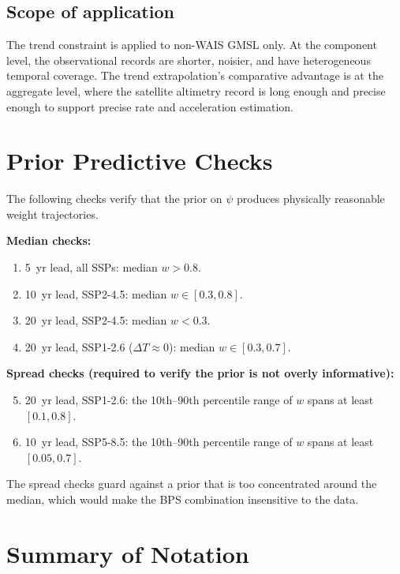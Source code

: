 \documentclass[11pt]{article}
\newcommand{\dT}{\Delta T}
\begin{document}
\subsection{Scope of application}

The trend constraint is applied to non-WAIS GMSL only.  At the component level, the observational records are shorter, noisier, and have heterogeneous temporal coverage.  The trend extrapolation's comparative advantage is at the aggregate level, where the satellite altimetry record is long enough and precise enough to support precise rate and acceleration estimation.


\section{Prior Predictive Checks}

The following checks verify that the prior on $\psi$ produces physically reasonable weight trajectories.

\textbf{Median checks:}
\begin{enumerate}
  \item 5~yr lead, all SSPs: median $w > 0.8$.
  \item 10~yr lead, SSP2-4.5: median $w \in [0.3, 0.8]$.
  \item 20~yr lead, SSP2-4.5: median $w < 0.3$.
  \item 20~yr lead, SSP1-2.6 ($\dT \approx 0$): median $w \in [0.3, 0.7]$.
\end{enumerate}

\textbf{Spread checks (required to verify the prior is not overly informative):}
\begin{enumerate}
  \setcounter{enumi}{4}
  \item 20~yr lead, SSP1-2.6: the 10th--90th percentile range of $w$ spans at least $[0.1, 0.8]$.
  \item 10~yr lead, SSP5-8.5: the 10th--90th percentile range of $w$ spans at least $[0.05, 0.7]$.
\end{enumerate}
The spread checks guard against a prior that is too concentrated around the median, which would make the BPS combination insensitive to the data.


\section{Summary of Notation}
\end{document}
